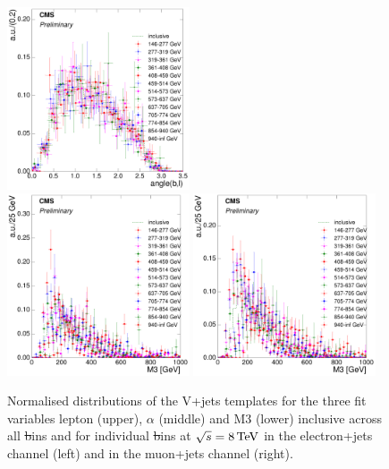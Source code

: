 \begin{figure}[hbtp]
     \includegraphics[width=0.48\textwidth]{Chapters/04_Analysis/04b_XSections/images/8TeV/fit_variables/muon/ST/angle_bl/vjets/ST_angle_bl_2orMoreBtags_VJets_template_comparison.pdf}\\
     \includegraphics[width=0.48\textwidth]{Chapters/04_Analysis/04b_XSections/images/8TeV/fit_variables/electron/ST/M3/vjets/ST_M3_2orMoreBtags_VJets_template_comparison.pdf}\hfill
     \includegraphics[width=0.48\textwidth]{Chapters/04_Analysis/04b_XSections/images/8TeV/fit_variables/muon/ST/M3/vjets/ST_M3_2orMoreBtags_VJets_template_comparison.pdf}\\
	 \caption[Normalised distributions of the V+jets templates for the three fit variables in \st
	 bins at $\sqrt{s}=8\TeV$.]{Normalised distributions of the V+jets templates for the three fit variables
	 lepton \abseta (upper), $\alpha$ (middle) and M3 (lower) inclusive across all \st bins and for individual
	 \st bins at $\sqrt{s}=8\TeV$ in the electron+jets channel (left) and in the muon+jets channel (right).}
     \label{fig:ST_fit_variable_vjets_comparisons_8TeV}
\end{figure}

